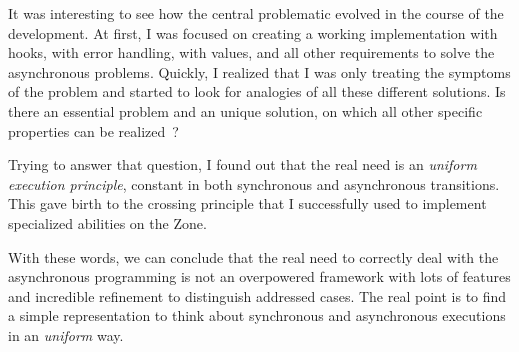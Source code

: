 It was interesting to see how the central problematic evolved in the course of the development. At first, I was focused on creating a working implementation with hooks, with error handling, with values, and all other requirements to solve the asynchronous problems. Quickly, I realized that I was only treating the symptoms of the problem and started to look for analogies of all these different solutions. Is there an essential problem and an unique solution, on which all other specific properties can be realized~?

Trying to answer that question, I found out that the real need is an \emph{uniform execution principle}, constant in both synchronous and asynchronous transitions. This gave birth to the crossing principle that I successfully used to implement specialized abilities on the Zone.

With these words, we can conclude that the real need to correctly deal with the asynchronous programming is not an overpowered framework with lots of features and incredible refinement to distinguish addressed cases. The real point is to find a simple representation to think about synchronous and asynchronous executions in an \emph{uniform} way.

